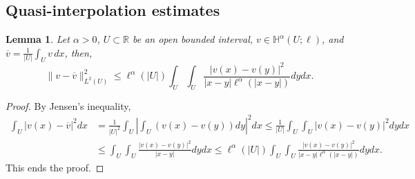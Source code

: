\documentclass[11 pt]{article}
\newtheorem{lemma}[theorem]{Lemma}
\numberwithin{equation}{section}
\def\R{\mathbb{R}}
\begin{document}
\subsection{Quasi-interpolation estimates}\label{sec:estimates}

\begin{lemma}\label{lem:poincare_type_weight}
Let $\alpha>0$, $U\subset \R$ be an open bounded interval, $v\in \mathbb H^{\alpha}(U;\ell)$, and $\overline v=\frac{1}{|U|}\int_{U}v\, dx$, then,
%
\begin{equation*}
    \|v-\overline{v}\|_{L^2(U)}^2\leq \ell^{\alpha}(|U|)\int_{U}\int_{U}\frac{|v(x)-v(y)|^2}{|x-y|\ell^{\alpha}(|x-y|)}dy dx.
\end{equation*}
%
\end{lemma}
%
\begin{proof}
By Jensen's inequality,
%
\begin{align*}
    \int_{U}|v(x)-\overline{v}|^2dx
    &=\frac{1}{|U|^2}\int_{U}\left|\int_{U}(v(x)-v(y))dy\right|^2dx \leq \frac{1}{|U|}\int_{U}\int_{U}|v(x)-v(y)|^2dy dx\\
&\leq \int_{U}\int_{U}\frac{|v(x)-v(y)|^2}{|x-y|}dy dx \leq \ell^{\alpha}(|U|)\int_{U}\int_{U}\frac{|v(x)-v(y)|^2}{|x-y|\ell^{\alpha}(|x-y|)}dy dx.
\end{align*}
%
This ends the proof. 
\end{proof}
\end{document}
